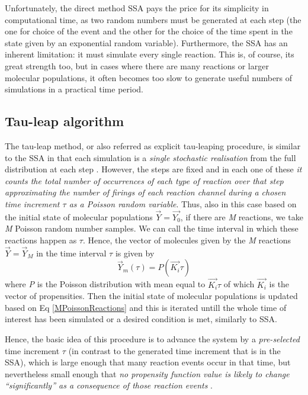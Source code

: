 \documentclass[12pt,a4paper]{report}
\begin{document}
Unfortunately, the direct method SSA pays the price for its simplicity in computational time, as two random numbers must be generated at each step \cite{Article} (the one for choice of the event and the other for the choice of the time spent in the state given by an exponential random variable). Furthermore, the SSA has an inherent limitation: it must simulate every single reaction. This is, of course, its great strength too, but in cases where there are many reactions or larger molecular populations, it often becomes too slow to generate useful numbers of simulations in a practical time period.

\subsection{Tau-leap algorithm}
The tau-leap method, or also referred as explicit tau-leaping procedure, is similar to the SSA in that each simulation is a \emph{single stochastic realisation} from the full distribution at each step \cite{Article}. However, the steps are fixed  and in each one of these \emph{it counts the total number of occurrences of each type of reaction over that step approximating the number of firings of each reaction channel during a chosen time increment $\tau$ as a Poisson random variable}. Thus, also in this case based on the initial state of molecular populations $\Vec{Y}=\Vec{Y_{0}}$, if there are \emph{M} reactions, we take \emph{M} Poisson random number samples. We can call the time interval in which these reactions happen as $\tau$. Hence, the vector of molecules given by the \emph{M} reactions $\Vec{Y}=\Vec{Y}_{M}$ in the time interval $\tau$ is given by
\begin{equation}\label{MPoissonReactions}
    \Vec{Y}_{m}(\tau) = P(\Vec{K_{i}}\tau)
\end{equation}
where \emph{P} is the Poisson distribution with mean equal to $\Vec{K_{i}}\tau$ of which $\Vec{K_{i}}$ is the vector of propensities. Then the initial state of molecular populations is updated based on Eq \ref{MPoissonReactions}  and this is iterated untill the whole time of interest has been simulated or a desired condition is met, similarly to SSA.


Hence, the basic idea of this procedure is to advance the system by a \emph{pre-selected} time increment $\tau$ (in contrast to the generated time increment that is in the SSA), which is large enough that many reaction events occur in that time, but nevertheless small enough that \emph{no propensity function value is likely to change ``significantly'' as a consequence of those reaction events} \cite{Method}.
\end{document}
